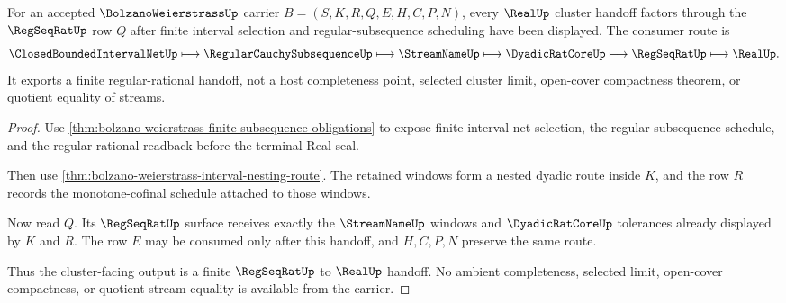 \begin{theorem}
\label{thm:bolzano-weierstrass-regseqrat-handoff}
For an accepted $\BolzanoWeierstrassUp$ carrier $B=(S,K,R,Q,E,H,C,P,N)$, every $\RealUp$ cluster handoff factors through the $\RegSeqRatUp$ row $Q$ after finite interval selection and regular-subsequence scheduling have been displayed. The consumer route is
$$
\ClosedBoundedIntervalNetUp \longmapsto \RegularCauchySubsequenceUp \longmapsto \StreamNameUp \longmapsto \DyadicRatCoreUp \longmapsto \RegSeqRatUp \longmapsto \RealUp .
$$
It exports a finite regular-rational handoff, not a host completeness point, selected cluster limit, open-cover compactness theorem, or quotient equality of streams.
\end{theorem}
\begin{proof}
Use \autoref{thm:bolzano-weierstrass-finite-subsequence-obligations} to expose finite interval-net selection, the regular-subsequence schedule, and the regular rational readback before the terminal Real seal.

Then use \autoref{thm:bolzano-weierstrass-interval-nesting-route}. The retained windows form a nested dyadic route inside $K$, and the row $R$ records the monotone-cofinal schedule attached to those windows.

Now read $Q$. Its $\RegSeqRatUp$ surface receives exactly the $\StreamNameUp$ windows and $\DyadicRatCoreUp$ tolerances already displayed by $K$ and $R$. The row $E$ may be consumed only after this handoff, and $H,C,P,N$ preserve the same route.

Thus the cluster-facing output is a finite $\RegSeqRatUp$ to $\RealUp$ handoff. No ambient completeness, selected limit, open-cover compactness, or quotient stream equality is available from the carrier.
\end{proof}

